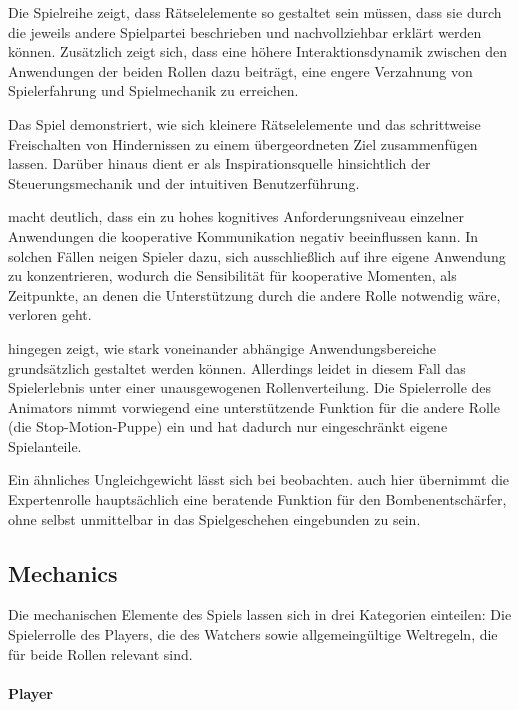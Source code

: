 Die Spielreihe  zeigt, dass Rätselelemente so gestaltet sein müssen, dass sie durch die jeweils andere Spielpartei beschrieben und nachvollziehbar erklärt werden können. Zusätzlich zeigt sich, dass eine höhere Interaktionsdynamik zwischen den Anwendungen der beiden Rollen dazu beiträgt, eine engere Verzahnung von Spielerfahrung und Spielmechanik zu erreichen.

Das Spiel  demonstriert, wie sich kleinere Rätselelemente und das schrittweise Freischalten von Hindernissen zu einem übergeordneten Ziel zusammenfügen lassen. Darüber hinaus dient er als Inspirationsquelle hinsichtlich der Steuerungsmechanik und der intuitiven Benutzerführung.

 macht deutlich, dass ein zu hohes kognitives Anforderungsniveau einzelner Anwendungen die kooperative Kommunikation negativ beeinflussen kann. In solchen Fällen neigen Spieler dazu, sich ausschließlich auf ihre eigene Anwendung zu konzentrieren, wodurch die Sensibilität für kooperative Momenten, als Zeitpunkte, an denen die Unterstützung durch die andere Rolle notwendig wäre, verloren geht.

 hingegen zeigt, wie stark voneinander abhängige Anwendungsbereiche grundsätzlich gestaltet werden können. Allerdings leidet in diesem Fall das Spielerlebnis unter einer unausgewogenen Rollenverteilung. Die Spielerrolle des Animators nimmt vorwiegend eine unterstützende Funktion für die andere Rolle (die Stop-Motion-Puppe) ein und hat dadurch nur eingeschränkt eigene Spielanteile.

Ein ähnliches Ungleichgewicht lässt sich bei  beobachten. auch hier übernimmt die Expertenrolle hauptsächlich eine beratende Funktion für den Bombenentschärfer, ohne selbst unmittelbar in das Spielgeschehen eingebunden zu sein.

\subsection{Mechanics}
Die mechanischen Elemente des Spiels lassen sich in drei Kategorien einteilen: Die Spielerrolle des Players, die des Watchers sowie allgemeingültige Weltregeln, die für beide Rollen relevant sind.

\paragraph{Player}

